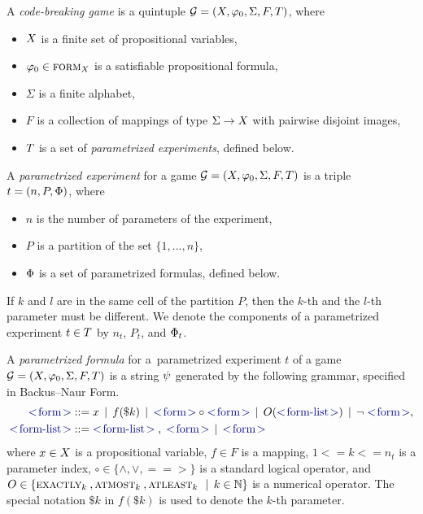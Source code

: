 \begin{definition} \label{def:game}
A \emph{code-breaking game} is a quintuple
  $\mathcal{G} = (X, \varphi_0, \Sigma, F, T)$, where
  \begin{itemize}
  \item $X$ is a finite set of propositional variables,
  \item $\varphi_0 \in \textsc{form}_X$ is a satisfiable propositional formula,
  \item $\Sigma$ is a finite alphabet,
  \item $F$ is a collection of mappings of type $\Sigma -> X$ with pairwise disjoint images,
  \item $T$ is a set of \emph{parametrized experiments}, defined below.
  \end{itemize}
\vspace{5mm}
\end{definition}
\vspace{-12mm}
\begin{definition} \label{def:exp}
A \emph{parametrized experiment} for a game
  $\mathcal{G} = (X, \varphi_0, \Sigma, F, T)$
  is a triple
  $t = (n, P, \Phi)$, where
  \begin{itemize}
  \item $n$ is the number of parameters of the experiment,
  \item $P$ is a partition of the set $\{1, ..., n\}$,
  \item $\Phi$ is a set of parametrized formulas, defined below.
  \end{itemize}
If $k$ and $l$ are in the same cell of the partition $P$, then the $k$-th and
the $l$-th parameter must be different.
We denote the components of a parametrized experiment $t\in T$
  by $n_t$, $P_t$, and $\Phi_t$.
\vspace{5mm}
\end{definition}
\vspace{-12mm}
\begin{definition} \label{def-pform}
A \emph{parametrized formula} for a~parametrized experiment
$t$ of a game $\mathcal{G} = (X, \varphi_0, \Sigma, F, T)$
  is a string $\psi$ generated by the following grammar, specified in Backus–Naur Form.
\begin{align*}
\msymb{form} &::= x \| f(\$k) \| \msymb{form} \circ \msymb{form} \| O(\msymb{form-list})  \| \neg\; \msymb{form},\\
\msymb{form-list} &::= \msymb{form-list} \;,\; \msymb{form} \| \msymb{form}
\end{align*}
  where $x\in X$ is a propositional variable, $f\in F$ is a mapping, $1<= k <= n_t$ is a parameter index,
  $\circ\in\{\wedge, \vee, ==>\}$ is a standard logical operator,
  and $O\in\{ \textsc{exactly}_{k}\:, \textsc{atmost}_{k}\:, \textsc{atleast}_{k}\: \:\:|\:\: k\in\mathbb{N}\}$ is
  a numerical operator.
The special notation $\$k$ in $f(\$k)$ is used to denote the $k$-th parameter.
\end{definition}

